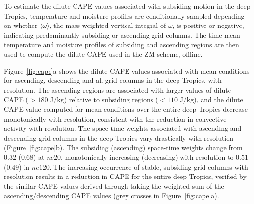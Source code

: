 \documentclass[times]{qjrms4}
\begin{document}
To estimate the dilute CAPE values associated with subsiding motion in the deep Tropics, temperature and moisture profiles are conditionally sampled depending on whether $\langle \omega \rangle$, the mass-weighted vertical integral of $\omega$, is positive or negative, indicating predominantly subsiding or ascending grid columns. The time mean temperature and moisture profiles of subsiding and ascending regions are then used to compute the dilute CAPE used in the ZM scheme, offline. 

Figure~\ref{fig:cape}a shows the dilute CAPE values associated with mean conditions for ascending, descending and all grid columns in the deep Tropics, with resolution. The ascending regions are associated with larger values of dilute CAPE ($>180$ J/kg) relative to subsiding regions ($<110$ J/kg), and the dilute CAPE value computed for mean conditions over the entire deep Tropics decrease monotonically with resolution, consistent with the reduction in convective activity with resolution. The space-time weights associated with ascending and descending grid columns in the deep Tropics vary drastically with resolution (Figure~\ref{fig:cape}b). The subsiding (ascending) space-time weights change from $0.32$ ($0.68$) at $ne20$, monotonically increasing (decreasing) with resolution to $0.51$ ($0.49$) in $ne120$. The increasing occurrence of stable, subsiding grid columns with resolution results in a reduction in CAPE for the entire deep Tropics, verified by the similar CAPE values derived through taking the weighted sum of the ascending/descending CAPE values (grey crosses in Figure~\ref{fig:cape}a).
\end{document}
